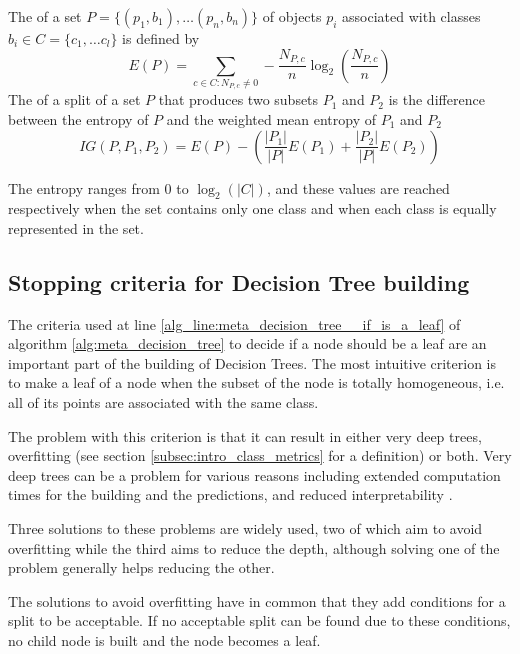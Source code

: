 \begin{definition}
    The  of a set $P = \{(p_1, b_1), \dots (p_n, b_n)\}$ of objects $p_i$ associated with classes $b_i \in C = \{c_1, \dots c_l\}$ is defined by
    \begin{equation}
        E(P) = \sum_{c \in C : N_{P, c} \neq 0} -\frac{N_{P, c}}{n} \log_2 \left( \frac{N_{P, c}}{n} \right)
    \end{equation}
    The  of a split of a set $P$ that produces two subsets $P_1$ and $P_2$ is the difference between the entropy of $P$ and the weighted mean entropy of $P_1$ and $P_2$
    \begin{equation}
        IG(P, P_1, P_2) = E(P) - \left(\frac{|P_1|}{|P|} E(P_1) + \frac{|P_2|}{|P|} E(P_2)\right)
    \end{equation}
\end{definition}
The entropy ranges from 0 to $\log_2(|C|)$, and these values are reached respectively when the set contains only one class and when each class is equally represented in the set.

\subsection{Stopping criteria for Decision Tree building}
The criteria used at line \ref{alg_line:meta_decision_tree__if_is_a_leaf} of algorithm \ref{alg:meta_decision_tree} to decide if a node should be a leaf are an important part of the building of Decision Trees. The most intuitive criterion is to make a leaf of a node when the subset of the node is totally homogeneous, i.e. all of its points are associated with the same class.

The problem with this criterion is that it can result in either very deep trees, overfitting (see section \ref{subsec:intro_class_metrics} for a definition) or both. Very deep trees can be a problem for various reasons including extended computation times for the building and the predictions, and reduced interpretability . 

Three solutions to these problems are widely used, two of which aim to avoid overfitting while the third aims to reduce the depth, although solving one of the problem generally helps reducing the other.

The solutions to avoid overfitting have in common that they add conditions for a split to be acceptable. If no acceptable split can be found due to these conditions, no child node is built and the node becomes a leaf.

